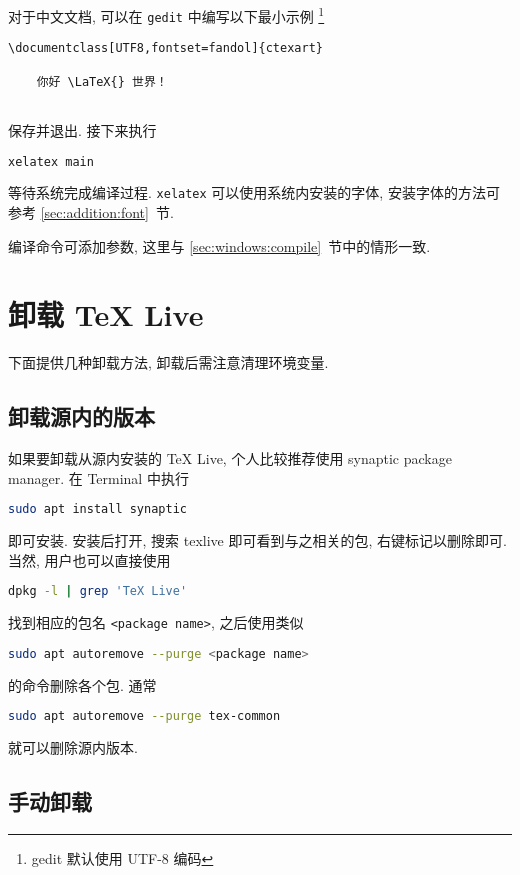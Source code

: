 对于中文文档, 可以在 \texttt{gedit} 中编写以下最小示例%
\footnote{gedit 默认使用 UTF-8 编码}%
\begin{lstlisting}[language={[LaTeX]TeX}]
  \documentclass[UTF8,fontset=fandol]{ctexart}
  
    你好 \LaTeX{} 世界！
  
\end{lstlisting}
保存并退出.
接下来执行
\begin{lstlisting}[language=bash]
  xelatex main
\end{lstlisting}
等待系统完成编译过程.
\texttt{xelatex} 可以使用系统内安装的字体,
安装字体的方法可参考 \ref{sec:addition:font}~节.

编译命令可添加参数, 这里与 \ref{sec:windows:compile}~节中的情形一致.

\section{卸载 \TeX{} Live}\label{sec:ubuntu:uninstall}

下面提供几种卸载方法,
卸载后需注意清理环境变量.

\subsection{卸载源内的版本}\label{sec:ubuntu:aptremove}

如果要卸载从源内安装的 \TeX{} Live, 个人比较推荐使用 synaptic package manager.
在 \textsf{Terminal} 中执行
\begin{lstlisting}[language = bash]
  sudo apt install synaptic
\end{lstlisting}
即可安装.
安装后打开, 搜索 \textsf{texlive} 即可看到与之相关的包, 右键标记以删除即可.
当然, 用户也可以直接使用
\begin{lstlisting}[language = bash]
  dpkg -l | grep 'TeX Live'
\end{lstlisting}
找到相应的包名 \texttt{<package name>}, 之后使用类似
\begin{lstlisting}[language = bash]
  sudo apt autoremove --purge <package name>
\end{lstlisting}
的命令删除各个包.
通常
\begin{lstlisting}[language = bash]
  sudo apt autoremove --purge tex-common
\end{lstlisting}
就可以删除源内版本.

\subsection{手动卸载}

